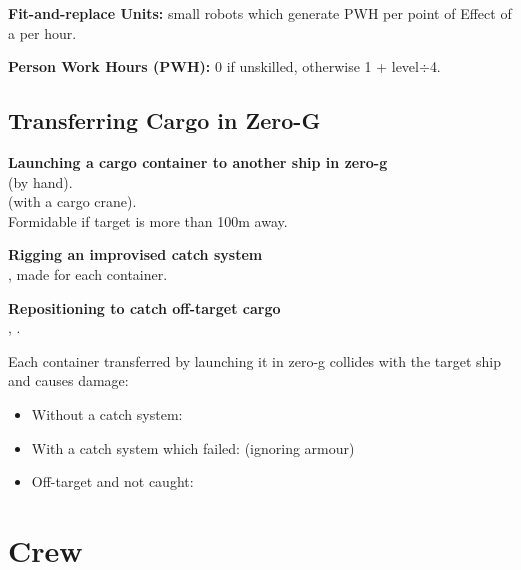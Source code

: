 \documentclass{cheatsheet}
\begin{document}
\begin{multicols}{2}
\textbf{Fit-and-replace Units:} small robots which generate 
PWH per point of Effect of a  per hour.

\textbf{Person Work Hours (PWH):} 0 if unskilled, otherwise 1 + level$\div$4.

\subsection{Transferring Cargo in Zero-G}

\begin{emphbox}
\textbf{Launching a cargo container to another ship in zero-g}\\
 (by hand).\\
 (with a cargo crane).\\
Formidable if target is more than 100m away.

\textbf{Rigging an improvised catch system}\\
, made for each container.

\textbf{Repositioning to catch off-target cargo}\\
, .
\end{emphbox}

Each container transferred by launching it in zero-g collides with the
target ship and causes damage:

\begin{itemize}
\item Without a catch system: 
\item With a catch system which failed:  (ignoring armour)
\item Off-target and not caught: 
\end{itemize}
\end{multicols}

\section{Crew}
\end{document}

